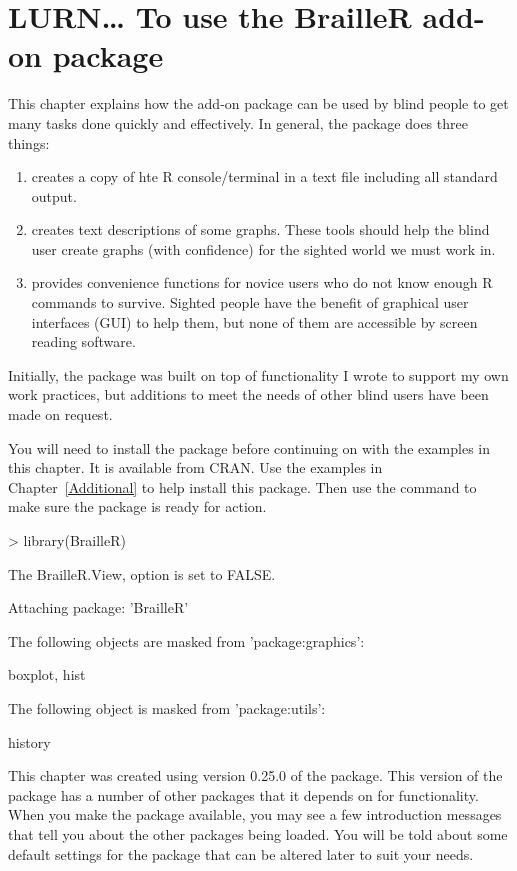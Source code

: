 \chapter{LURN\ldots{} To use the BrailleR add-on package} 
\label{BrailleR} 
 

 
This chapter explains how the  add-on package can be used by blind people to get many tasks done quickly and effectively. In general, the package does three things:\begin{enumerate} 
\item creates a copy of hte R console/terminal in a text file including all standard output. 
\item creates text descriptions of some graphs. These tools should help the blind user create graphs (with confidence) for the sighted world we must work in. 
\item provides convenience functions for novice users who do not know enough R commands to survive. Sighted people have the benefit of graphical user interfaces (GUI) to help them, but none of them are accessible by screen reading software. 
\end{enumerate} 
Initially, the package was built on top of functionality I wrote to support my own work practices, but additions to meet the needs of other blind \R{} users have been made on request.  
 
 
You will need to install the  package before continuing on with the examples in this chapter. It is available from CRAN. Use the examples in Chapter~\ref{Additional} to help install this package. Then use the  command to make sure the package is ready for action. 
\begin{Schunk}
\begin{Sinput}
> library(BrailleR) 
\end{Sinput}
\begin{Soutput}
The BrailleR.View,  option is set to FALSE.
\end{Soutput}
\begin{Soutput}

Attaching package: 'BrailleR'
\end{Soutput}
\begin{Soutput}
The following objects are masked from 'package:graphics':

    boxplot, hist
\end{Soutput}
\begin{Soutput}
The following object is masked from 'package:utils':

    history
\end{Soutput}
\end{Schunk}
This chapter was created using version 0.25.0 of the  package. This version of the package has a number of other packages that it depends on for functionality. When you make the  package available, you may see a few introduction messages that tell you about the other packages being loaded. You will be told about some default settings for the package that can be altered later to suit your needs. 
 
